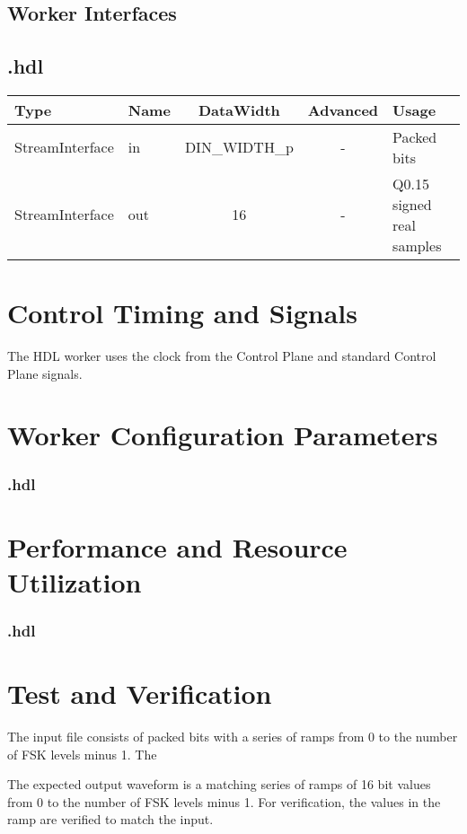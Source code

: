 \begin{landscape}
	\section*{Worker Interfaces}
	\subsection*{\comp.hdl}
	\begin{scriptsize}
		\begin{tabular}{|M{2cm}|M{1.5cm}|c|c|p{12cm}|}
			\hline
			Type            & Name & DataWidth 		& Advanced  & Usage                 		\\
			\hline
			StreamInterface & in   & DIN\_WIDTH\_p	& - 		& Packed bits					\\
			\hline
			StreamInterface & out  & 16        		& -			& Q0.15 signed real samples 	\\
			\hline
		\end{tabular}
	\end{scriptsize}
\end{landscape}

\section*{Control Timing and Signals}
\begin{flushleft}
	The \Comp{} HDL worker uses the clock from the Control Plane and standard Control Plane signals.\\
\end{flushleft}

\begin{landscape}
\section*{Worker Configuration Parameters}
\subsubsection*{\comp.hdl}
%
\section*{Performance and Resource Utilization}
\subsubsection*{\comp.hdl}
%
\end{landscape}
\section*{Test and Verification}
\begin{flushleft}
	The input file consists of packed bits with a series of ramps from 0 to the number of FSK levels minus 1. The \medskip

	The expected output waveform is a matching series of ramps of 16 bit values from 0 to the number of FSK levels minus 1. For verification, the values in the ramp are verified to match the input.
\end{flushleft}

